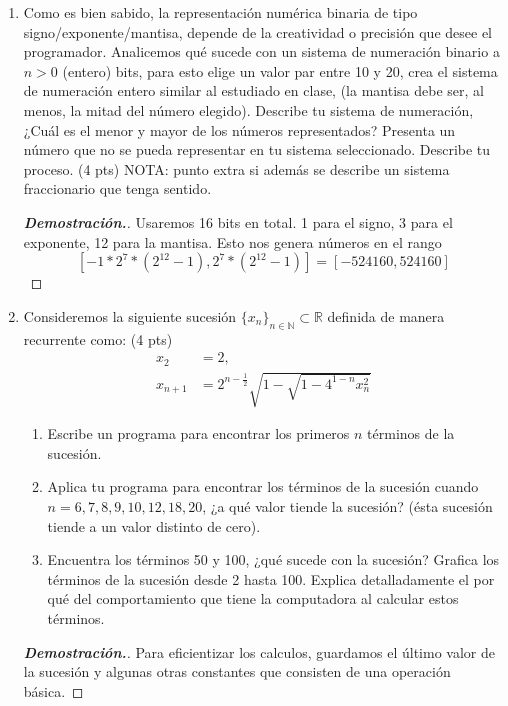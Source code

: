 \documentclass{article}
\newcommand{\N}{\mathbb N}
\newcommand{\R}{\mathbb R}
\begin{document}
	
	\begin{enumerate}
		
		
		\item Como es bien sabido, la representaci\'on num\'erica binaria de tipo signo/exponente/mantisa, depende de la creatividad o precisi\'on que desee el programador. Analicemos qu\'e sucede con un sistema de numeraci\'on binario a $n>0$ (entero) bits, para esto elige un valor par entre 10 y 20, crea el sistema de numeraci\'on entero similar al estudiado en clase, (la mantisa debe ser, al menos, la mitad del n\'umero elegido). Describe tu sistema de numeraci\'on, ¿Cu\'al es el menor y mayor de los n\'umeros representados? Presenta un n\'umero que no se pueda representar en tu sistema seleccionado. Describe tu proceso. (4 pts) NOTA: punto extra si adem\'as se describe un sistema fraccionario que tenga sentido.
		\begin{mdframed}[
			linecolor=darkgray,
			backgroundcolor=pearl]
			\begin{proof}[\textbf{Demostraci\'on.}]
				Usaremos 16 bits en total. 1 para el signo, 3 para el exponente, 12 para la mantisa. Esto nos genera n\'umeros en el rango
				\[ [-1*2^7*(2^{12} - 1), 2^7*(2^{12} - 1)] = [-524160, 524160] \]
			\end{proof}
		\end{mdframed}
		
		\item Consideremos la siguiente sucesi\'on $\{x_n\}_{n\in \N} \subset \R$ definida de manera recurrente como: (4 pts)
		\begin{align*}
			x_2&=2,\\
			x_{n+1} &= 2^{n-\frac{1}{2}}\sqrt{1-\sqrt{1-4^{1-n}x^2_n}}
		\end{align*}
		\begin{enumerate}
			\item Escribe un programa para encontrar los primeros $n$ t\'erminos de la sucesi\'on.
			\item Aplica tu programa para encontrar los t\'erminos de la sucesi\'on cuando $n = 6, 7, 8, 9, 10, 12, 18, 20$, ¿a qu\'e valor tiende la sucesi\'on? (\'esta sucesi\'on tiende a un valor distinto de cero).
			\item Encuentra los t\'erminos 50 y 100, ¿qu\'e sucede con la sucesi\'on? Grafica los t\'erminos de la sucesi\'on desde 2 hasta 100. Explica detalladamente el por qu\'e del comportamiento que tiene la computadora al calcular estos t\'erminos.
		\end{enumerate}
		\begin{mdframed}[
			linecolor=darkgray,
			backgroundcolor=pearl]
			\begin{proof}[\textbf{Demostraci\'on.}]
				Para eficientizar los calculos, guardamos el \'ultimo valor de la sucesi\'on y algunas otras constantes que consisten de una operaci\'on b\'asica. 
				
			\end{proof}
		\end{mdframed}
		

\end{enumerate}
\end{document}
